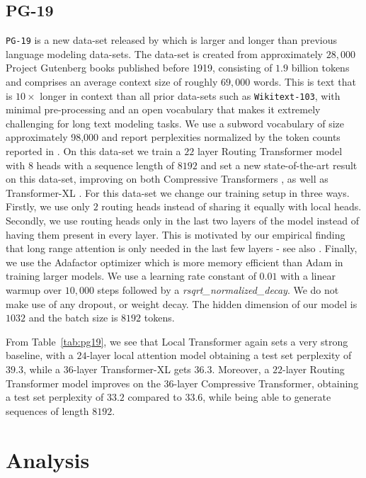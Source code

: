 \subsection{PG-19}\label{sec:pg19}
\texttt{PG-19} is a new data-set released by \citet{rae2020compressive}
which is larger and longer than previous language modeling data-sets. The data-set is created from approximately \(28,000\) Project Gutenberg books published before 1919, consisting of \(1.9\) billion tokens and comprises an average context size of roughly \(69,000\) words. This is text that is \(10\times\) longer in context than all prior data-sets such as \texttt{Wikitext-103}, with minimal pre-processing and an open vocabulary that makes it extremely challenging for long text modeling tasks. We use a subword vocabulary of size approximately 98,000 and report perplexities normalized by the token counts reported in \citet{rae2020compressive}.
On this data-set we train a \(22\) layer Routing Transformer model with \(8\) heads with a sequence length of \(8192\) and set a new state-of-the-art result on this data-set, improving on both Compressive Transformers \citep{rae2020compressive}, as well as Transformer-XL \citep{dai2019transformer}. For this data-set we change our training setup in three ways. Firstly, we use only \(2\) routing heads instead of sharing it equally with local heads. Secondly, we use routing heads only in the last two layers of the model instead of having them present in every layer. This is motivated by our empirical finding that long range attention is only needed in the last few layers - see also \citet{rae-razavi-2020-transformers}. Finally, we use the Adafactor optimizer \citep{shazeer2018adafactor} which is more memory efficient than Adam in training larger models. We use a learning rate constant of \(0.01\) with a linear warmup over \(10,000\) steps followed by a \emph{rsqrt_normalized_decay}. We do not make use of any dropout, or weight decay. The hidden dimension of our model is \(1032\) and the batch size is \(8192\) tokens. 

From Table~\ref{tab:pg19}, we see that Local Transformer again sets a very strong baseline, with a \(24\)-layer
local attention model obtaining a test set perplexity of \(39.3\), while a \(36\)-layer Transformer-XL gets
\(36.3\). Moreover, a \(22\)-layer Routing Transformer model improves on the \(36\)-layer Compressive Transformer, obtaining a test set perplexity of \(33.2\) compared to \(33.6\), 
while being able to generate sequences of length \(8192\).

\section{Analysis}\label{sec:analysis}
